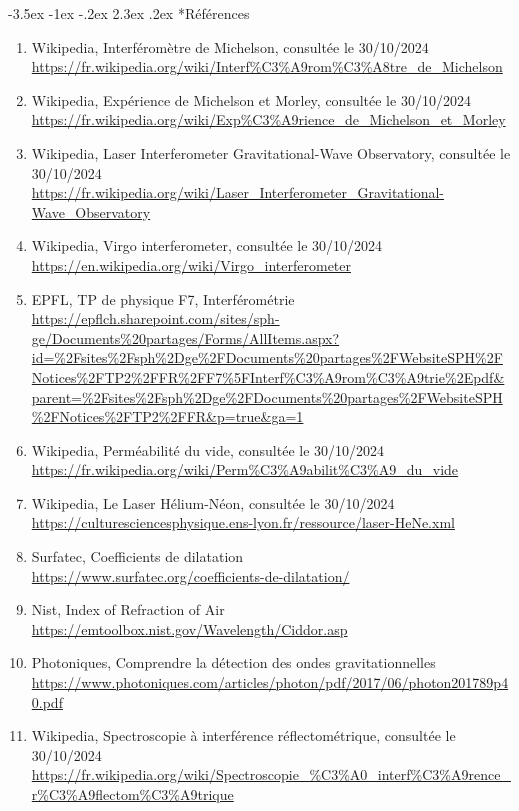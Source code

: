 \documentclass[a4paper, 12pt,oneside]{article}
\makeatletter
\renewcommand{\subsection}{\@startsection {subsection}{1}{\z@}%
             {-3.5ex \@plus -1ex \@minus -.2ex}%
             {2.3ex \@plus.2ex}%
             {\normalfont\normalsize\bfseries}}
\makeatother
\begin{document}
\subsection*{Références}
\renewcommand{\labelenumi}{[\theenumi]}
\begin{enumerate}

    \item \label{ref1} Wikipedia, Interféromètre de Michelson, consultée le 30/10/2024\\
    \url{https://fr.wikipedia.org/wiki/Interf%C3%A9rom%C3%A8tre_de_Michelson}
    \item \label{ref2} Wikipedia, Expérience de Michelson et Morley, consultée le 30/10/2024\\
    \url{https://fr.wikipedia.org/wiki/Exp%C3%A9rience_de_Michelson_et_Morley}
    \item \label{ref3} Wikipedia, Laser Interferometer Gravitational-Wave Observatory, consultée le 30/10/2024 \\
    \url{https://fr.wikipedia.org/wiki/Laser_Interferometer_Gravitational-Wave_Observatory}
    \item \label{ref4} Wikipedia, Virgo interferometer, consultée le 30/10/2024\\
    \url{https://en.wikipedia.org/wiki/Virgo_interferometer}
    \item \label{ref5} EPFL, TP de physique F7, Interférométrie\\
    \url{https://epflch.sharepoint.com/sites/sph-ge/Documents%20partages/Forms/AllItems.aspx?id=%2Fsites%2Fsph%2Dge%2FDocuments%20partages%2FWebsiteSPH%2FNotices%2FTP2%2FFR%2FF7%5FInterf%C3%A9rom%C3%A9trie%2Epdf&parent=%2Fsites%2Fsph%2Dge%2FDocuments%20partages%2FWebsiteSPH%2FNotices%2FTP2%2FFR&p=true&ga=1}
    \item \label{ref6} Wikipedia, Perméabilité du vide, consultée le 30/10/2024\\
    \url{https://fr.wikipedia.org/wiki/Perm%C3%A9abilit%C3%A9_du_vide}
    \item \label{ref7} Wikipedia, Le Laser Hélium-Néon, consultée le 30/10/2024\\
    \url{https://culturesciencesphysique.ens-lyon.fr/ressource/laser-HeNe.xml}
    \item \label{ref8} Surfatec, Coefficients de dilatation \\
    \url{https://www.surfatec.org/coefficients-de-dilatation/}
    \item \label{ref9} Nist, Index of Refraction of Air\\
    \url{https://emtoolbox.nist.gov/Wavelength/Ciddor.asp}
    \item \label{ref10} Photoniques, Comprendre la détection des ondes gravitationnelles\\
    \url{https://www.photoniques.com/articles/photon/pdf/2017/06/photon201789p40.pdf}
    \item \label{ref11} Wikipedia, Spectroscopie à interférence réflectométrique, consultée le 30/10/2024\\
    \url{https://fr.wikipedia.org/wiki/Spectroscopie_%C3%A0_interf%C3%A9rence_r%C3%A9flectom%C3%A9trique}
\end{enumerate}
\end{document}
